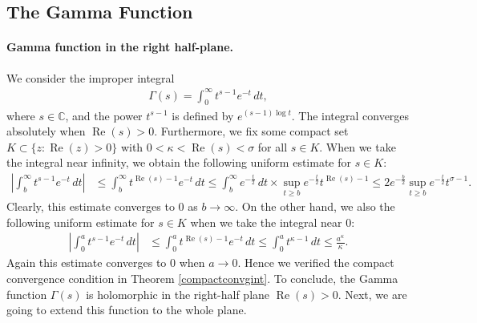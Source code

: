 \documentclass{article}
\numberwithin{equation}{section}
\newcommand{\bbC}{\mathbb{C}}
\DeclareMathOperator{\re}{Re}
\theoremstyle{plain}
\theoremstyle{definition}
\begin{document}
\subsection{The Gamma Function}
\paragraph{Gamma function in the right half-plane.} We consider the improper integral
\begin{align*}
	\Gamma(s)=\int_0^\infty t^{s-1}e^{-t}\,dt,
\end{align*}
where $s\in\bbC$, and the power $t^{s-1}$ is defined by $e^{(s-1)\log t}$. The integral converges absolutely when $\re(s)>0$. Furthermore, we fix some compact set $K\subset\{z:\re(z)>0\}$ with $0<\kappa<\re(s)<\sigma$ for all $s\in K$. When we take the integral near infinity, we obtain the following uniform estimate for $s\in K$: 
\begin{align*}
	\left\vert\int_b^\infty t^{s-1}e^{-t}\,dt\right\vert&\leq\int_b^\infty t^{\re(s)-1}e^{-t}\,dt\leq\int_b^\infty e^{-\frac{t}{2}}\,dt\times\sup_{t\geq b}e^{-\frac{t}{2}}t^{\re(s)-1}\leq 2e^{-\frac{b}{2}}\sup_{t\geq b}e^{-\frac{t}{2}}t^{\sigma-1}.
\end{align*}
Clearly, this estimate converges to $0$ as $b\to\infty$. On the other hand, we also the following uniform estimate for $s\in K$ when we take the integral near $0$:
\begin{align*}
	\left\vert\int_0^a t^{s-1}e^{-t}\,dt\right\vert&\leq\int_0^a t^{\re(s)-1}e^{-t}\,dt\leq\int_0^a t^{\kappa-1}\,dt\leq\frac{a^{\kappa}}{\kappa}.
\end{align*}
Again this estimate converges to $0$ when $a\to 0$. Hence we verified the compact convergence condition in Theorem \ref{compactconvgint}. To conclude, the Gamma function $\Gamma(s)$ is holomorphic in the right-half plane $\re(s)>0$. Next, we are going to extend this function to the whole plane.
\end{document}
